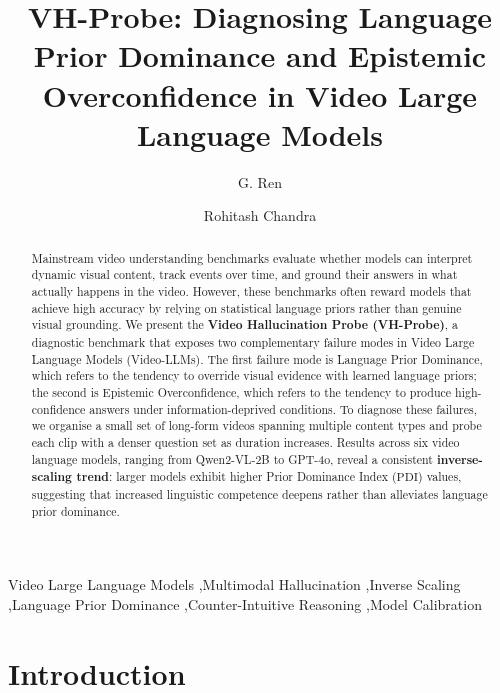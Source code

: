 \documentclass[final,5p,times,twocolumn]{elsarticle}
\newcommand{\PDI}{\mathrm{PDI}}
\begin{document}
\begin{frontmatter}

\title{VH-Probe: Diagnosing Language Prior Dominance and Epistemic Overconfidence in Video Large Language Models}

\author[first]{G. Ren}
\author[second]{Rohitash Chandra}

\begin{abstract}
Mainstream video understanding benchmarks evaluate whether models can
interpret dynamic visual content, track events over time, and ground
their answers in what actually happens in the video. However, these
benchmarks often reward models that achieve high accuracy by relying on
statistical language priors rather than genuine visual grounding. We
present the \textbf{Video Hallucination Probe (VH-Probe)}, a
diagnostic benchmark that exposes two complementary failure modes in
Video Large Language Models (Video-LLMs). The first failure mode is
Language Prior Dominance, which refers to the tendency to
override visual evidence with learned language priors; the second is
Epistemic Overconfidence, which refers to the tendency to produce
high-confidence answers under information-deprived conditions. To
diagnose these failures, we organise a small set of long-form videos
spanning multiple content types and probe each clip with a denser
question set as duration increases. Results across six video language
models, ranging from Qwen2-VL-2B to GPT-4o, reveal a consistent
\textbf{inverse-scaling trend}: larger models exhibit higher Prior
Dominance Index ($\PDI$) values, suggesting
that increased linguistic competence deepens rather than alleviates
language prior dominance.
\end{abstract}

\begin{keyword}
Video Large Language Models \sep Multimodal Hallucination \sep Inverse Scaling \sep Language Prior Dominance \sep Counter-Intuitive Reasoning \sep Model Calibration
\end{keyword}


\end{frontmatter}

\section{Introduction}
\label{introduction}
\end{document}
